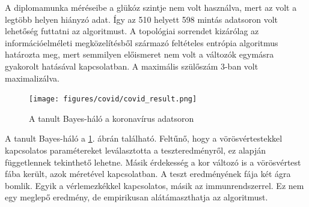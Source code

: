 A diplomamunka méréseibe a glükóz szintje nem volt használva, mert az volt a legtöbb helyen hiányzó adat. Így az 510 helyett 598 mintás adatsoron volt lehetőség futtatni az algoritmust. A topológiai sorrendet kizárólag az információelméleti megközelítésből származó feltételes entrópia algoritmus határozta meg, mert semmilyen előismeret nem volt a változók egymásra gyakorolt hatásával kapcsolatban. A maximális szülőszám 3-ban volt maximalizálva.

\begin{figure}[htp]
    \centering
    \texttt{[image: figures/covid/covid\_result.png]}
    \caption{A tanult Bayes-háló a koronavírus adatsoron}
    \label{fig:covid_result}
\end{figure}

A tanult Bayes-háló a \ref{fig:covid_result}. ábrán található. Feltűnő, hogy a vörösvértestekkel kapcsolatos paramétereket leválasztotta a teszteredményről, ez alapján függetlennek tekinthető lehetne. Másik érdekesség a kor változó is a vörösvértest fába került, azok méretével kapcsolatban. A teszt eredményének fája két ágra bomlik. Egyik a vérlemezkékkel kapcsolatos, másik az immunrendszerrel. Ez nem egy meglepő eredmény, de empirikusan alátámaszthatja az algoritmust.
